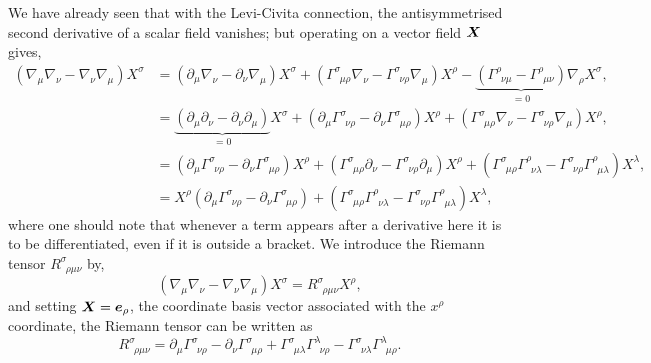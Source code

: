 We have already seen that with the Levi-Civita connection, the antisymmetrised second derivative of a scalar field vanishes; but operating on a vector field $\boldsymbol{X}$ gives,
\begin{align}
(\nabla_\mu \nabla_\nu  - \nabla_\nu \nabla_\mu )X^\sigma &=(\partial_\mu \nabla_\nu  - \partial_\nu \nabla_\mu )X^\sigma + (\Gamma^{\sigma}_{\,\,\,\mu\rho}\nabla_\nu -\Gamma^{\sigma}_{\,\,\,\nu\rho}\nabla_\mu  )X^\rho - \underbrace{(\Gamma^{\rho}_{\,\,\,\nu\mu} - \Gamma^{\rho}_{\,\,\,\mu\nu})}_{=0}\nabla_\rho X^\sigma , \\
                         &=\underbrace{(\partial_\mu \partial_\nu  - \partial_\nu \partial_\mu )}_{=0}X^\sigma + (\partial_\mu \Gamma^\sigma_{\,\,\,\nu\rho}  - \partial_\nu \Gamma^\sigma_{\,\,\,\mu\rho} )X^\rho + (\Gamma^{\sigma}_{\,\,\,\mu\rho}\nabla_\nu -\Gamma^{\sigma}_{\,\,\,\nu\rho}\nabla_\mu  )X^\rho  , \\
                         &=(\partial_\mu \Gamma^\sigma_{\,\,\,\nu\rho}  - \partial_\nu \Gamma^\sigma_{\,\,\,\mu\rho} )X^\rho + (\Gamma^{\sigma}_{\,\,\,\mu\rho}\partial_\nu -\Gamma^{\sigma}_{\,\,\,\nu\rho}\partial_\mu  )X^\rho 
                         + (\Gamma^{\sigma}_{\,\,\,\mu\rho}\Gamma^\rho_{\,\,\,\nu\lambda} -\Gamma^{\sigma}_{\,\,\,\nu\rho}\Gamma^\rho_{\,\,\,\mu\lambda} )X^\lambda,\\
                         &=X^\rho(\partial_\mu \Gamma^\sigma_{\,\,\,\nu\rho}  - \partial_\nu \Gamma^\sigma_{\,\,\,\mu\rho} ) + (\Gamma^{\sigma}_{\,\,\,\mu\rho}\Gamma^\rho_{\,\,\,\nu\lambda} -\Gamma^{\sigma}_{\,\,\,\nu\rho}\Gamma^\rho_{\,\,\,\mu\lambda} )X^\lambda,
\end{align}
where one should note that whenever a term appears after a derivative here it is to be differentiated, even if it is outside a bracket. We introduce the Riemann tensor $R^\sigma_{\,\,\,\rho\mu\nu}$ by,
\begin{equation}
(\nabla_\mu \nabla_\nu  - \nabla_\nu \nabla_\mu )X^\sigma = R^\sigma_{\,\,\,\rho\mu\nu} X^\rho,
\end{equation}
and setting $\boldsymbol{X} = \boldsymbol{e}_{\rho}$, the coordinate basis vector associated with the $x^\rho$ coordinate, the Riemann tensor can be written as
\begin{equation}
R^\sigma_{\,\,\,\rho\mu\nu} = \partial_\mu \Gamma^\sigma_{\,\,\,\nu\rho}  - \partial_\nu \Gamma^\sigma_{\,\,\,\mu\rho}  + \Gamma^{\sigma}_{\,\,\,\mu\lambda}\Gamma^\lambda_{\,\,\,\nu\rho} -\Gamma^{\sigma}_{\,\,\,\nu\lambda}\Gamma^\lambda_{\,\,\,\mu\rho}. 
\end{equation}


